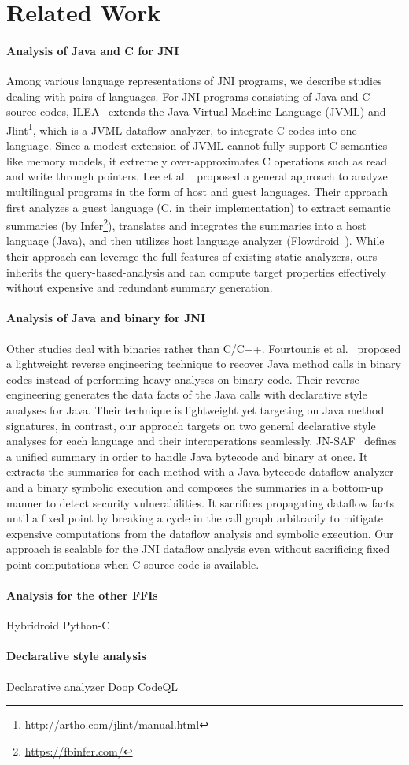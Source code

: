 \section{Related Work}
\paragraph{Analysis of Java and C for JNI}
Among various language representations of JNI programs, we describe studies
dealing with pairs of languages.
For JNI programs consisting of Java and C source codes, ILEA~\cite{ILEA} extends
the Java Virtual Machine Language (JVML) and Jlint\footnote{\url{http://artho.com/jlint/manual.html}}, which is a JVML dataflow
analyzer, to integrate C codes into one language.  Since a modest extension of
JVML cannot fully support C semantics like memory models, it extremely
over-approximates C operations such as read and write through pointers.
Lee et al.~\cite{LeeASE20} proposed a general approach to analyze multilingual
programs in the form of host and guest languages.  Their approach first analyzes
a guest language (C, in their implementation) to extract semantic summaries
(by Infer\footnote{\url{https://fbinfer.com/}}), translates and integrates the summaries into a host
language (Java), and then utilizes host language analyzer (Flowdroid~\cite{Flowdroid}).
While their approach can leverage the full features of existing static
analyzers, ours inherits the query-based-analysis and can compute target
properties effectively without expensive and redundant summary generation.

\paragraph{Analysis of Java and binary for JNI}
Other studies deal with binaries rather than C/C++.
Fourtounis et al.~\cite{scanning} proposed a lightweight reverse engineering
technique to recover Java method calls in binary codes instead of performing
heavy analyses on binary code.  Their reverse engineering generates the data
facts of the Java calls with declarative style analyses for Java.
Their technique is lightweight yet targeting on Java method signatures,
in contrast, our approach targets on two general declarative style analyses for
each language and their interoperations seamlessly.
JN-SAF~\cite{JN-SAF} defines a unified summary in order to handle Java bytecode
and binary at once.  It extracts the summaries for each method with a Java
bytecode dataflow analyzer and a binary symbolic execution and composes the
summaries in a bottom-up manner to detect security vulnerabilities.
It sacrifices propagating dataflow facts until a fixed point by breaking a cycle
in the call graph arbitrarily to mitigate expensive computations from the
dataflow analysis and symbolic execution.  Our approach is scalable
for the JNI dataflow analysis even without sacrificing fixed point computations
when C source code is available.

\paragraph{Analysis for the other FFIs}
Hybridroid
Python-C

\paragraph{Declarative style analysis}
Declarative analyzer
Doop
CodeQL

